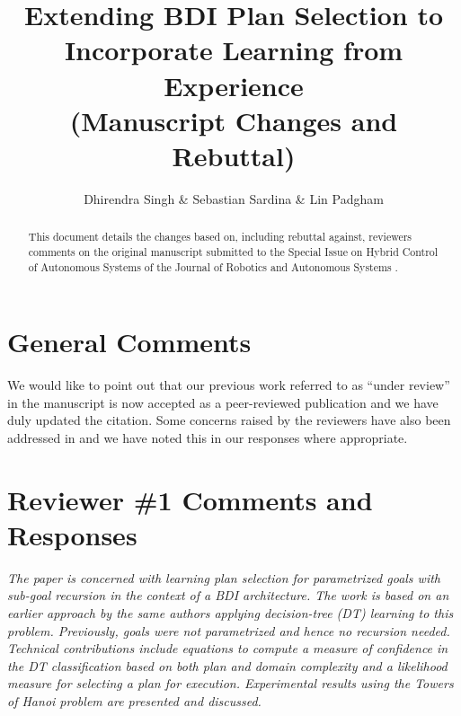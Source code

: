 \documentclass[preprint,12pt]{elsarticle}
\begin{document}
\begin{frontmatter}

\title{Extending BDI Plan Selection to Incorporate Learning from Experience\\(Manuscript Changes and Rebuttal)}

\author{Dhirendra Singh \& Sebastian Sardina \& Lin Padgham}
\address{RMIT University, Melbourne, Australia}

\begin{abstract}
This document details the changes based on, including rebuttal against, reviewers comments on the original manuscript submitted to the Special Issue on Hybrid Control of Autonomous Systems of the Journal of Robotics and Autonomous Systems \cite{Singh:HYCAS10}.    
\end{abstract}

\end{frontmatter}


\section*{General Comments}

We would like to point out that our previous work referred to as ``under review'' in the manuscript  is now accepted as a peer-reviewed publication \cite{Singh:AAMAS10} and we have duly updated the citation. Some concerns raised by the reviewers have also been addressed in \cite{Singh:AAMAS10} and we have noted this in our responses where appropriate.

\section{Reviewer \#1 Comments and Responses}

{\em The paper is concerned with learning plan selection for parametrized goals with sub-goal recursion in the context of a BDI architecture. The work is based on an earlier approach by the same authors applying decision-tree (DT) learning to this problem. Previously, goals were not parametrized and hence no recursion needed. Technical contributions include equations to compute a measure of confidence in the DT classification based on both plan and domain complexity and a likelihood measure for selecting a plan for execution. Experimental results using the Towers of Hanoi problem are presented and discussed.}
\end{document}
